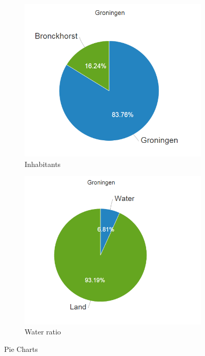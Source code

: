 \documentclass[a4paper,twoside,11pt]{article}
\begin{document}
\begin{figure}
        \begin{subfigure}[b]{0.2\textwidth}
                \includegraphics[width=\textwidth]{Visualization/PieChartInhabitants.png}
                \caption{Inhabitants}
                \label{fig:Inhabitants}
        \end{subfigure}
        \begin{subfigure}[b]{0.2\textwidth}
                \includegraphics[width=\textwidth]{Visualization/PieChartWater.png}
                \caption{Water ratio}
                \label{fig:Water}
        \end{subfigure}
        \caption{Pie Charts}\label{fig:PieCharts}
\end{figure}
\newline
\newline
\newline
\newline
\newline
\newline
\newline
\newline
\newline
\newline
\end{document}
